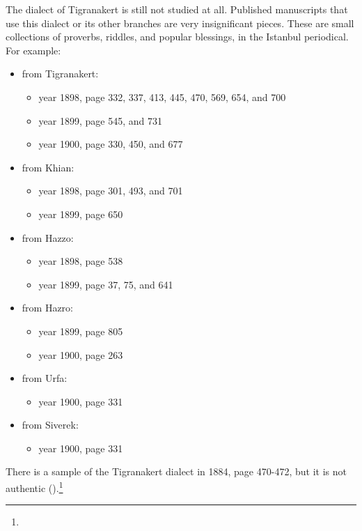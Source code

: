 

The dialect of Tigranakert is still not studied at all. Published manuscripts that use this dialect or its other branches are very insignificant pieces. These are small collections of proverbs, riddles, and popular blessings, in the Istanbul  periodical. For example:
\begin{itemize}
	\item from Tigranakert: 
	\begin{itemize}
		\item year 1898, page 332, 337, 413, 445, 470, 569, 654, and 700 
		\item year 1899, page 545, and 731 
		\item year 1900, page 330, 450, and 677 
	\end{itemize}
	\item from Khian: 
	\begin{itemize}
		\item year 1898, page 301, 493, and 701 
		\item year 1899, page 650 
	\end{itemize}
	\item from Hazzo: 
	\begin{itemize}
		\item year 1898, page 538 
		\item year 1899, page 37, 75, and 641 
	\end{itemize}
	\item from Hazro: 
	\begin{itemize}
		\item year 1899, page 805 
		\item year 1900, page 263 
	\end{itemize}
	\item from Urfa:
	\begin{itemize}
		\item year 1900, page 331 
	\end{itemize}
	\item from Siverek:
	\begin{itemize}
		\item year 1900, page 331 
	\end{itemize}
	
\end{itemize}

There is a sample of the Tigranakert dialect in  1884, page 470-472, but it is not authentic ().\footnote{}


